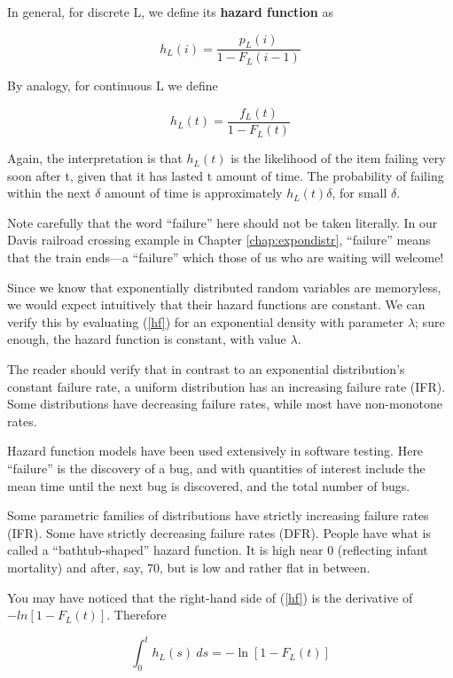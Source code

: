 In general, for discrete L, we define its {\bf hazard function} as

\begin{equation}
h_L(i) = \frac{p_L(i)}{1-F_L(i-1)}
\end{equation}

By analogy, for continuous L we define 

\begin{equation}
\label{hf}
h_L(t) = \frac{f_L(t)}{1-F_L(t)} 
\end{equation}

Again, the interpretation is that $h_L(t)$ is the likelihood of the item
failing very soon after t, given that it has lasted t amount of time.
The probability of failing within the next $\delta$ amount of time is
approximately $h_L(t) \delta$, for small $\delta$.

Note carefully that the word ``failure'' here should not be taken
literally.  In our Davis railroad crossing example in Chapter
\ref{chap:expondistr}, ``failure'' means that the train ends---a
``failure'' which those of us who are waiting will welcome!

Since we know that exponentially distributed random variables are
memoryless, we would expect intuitively that their hazard functions are
constant.  We can verify this by evaluating (\ref{hf}) for an
exponential density with parameter $\lambda$; sure enough, the hazard
function is constant, with value $\lambda$.

The reader should verify that in contrast to an exponential
distribution's constant failure rate, a uniform distribution has an
increasing failure rate (IFR).  Some distributions have decreasing
failure rates, while most have non-monotone rates.

Hazard function models have been used extensively in software testing.
Here ``failure'' is the discovery of a bug, and with quantities of
interest include the mean time until the next bug is discovered, and the
total number of bugs.

Some parametric families of distributions have strictly increasing
failure rates (IFR).  Some have strictly decreasing failure rates (DFR).
People have what is called a ``bathtub-shaped'' hazard function.  It is
high near 0 (reflecting infant mortality) and after, say, 70, but is low
and rather flat in between.

You may have noticed that the right-hand side of (\ref{hf}) is the
derivative of $-ln[1-F_L(t)]$.  Therefore

\begin{equation}
\int_{0}^{t} h_L(s) ~ ds = -\ln[1-F_L(t)]
\end{equation}

